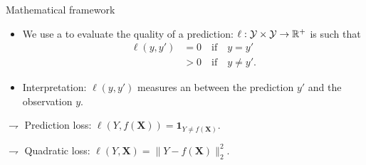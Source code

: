 \documentclass[xcolor={usenames,dvipsnames},handout]{beamer}
\begin{document}
%


\begin{frame}{Mathematical framework}

\begin{itemize}
\item We  use a  to evaluate the quality of a prediction: $\ell : {\mathcal{Y}} \times {\mathcal{Y}} \to \mathbb{R}^+$ is such that
\begin{align*}
\ell(y,y') &= 0 \quad \text{if} \quad y=y' \\
& >0 \quad \text{if} \quad y\neq y'.
\end{align*}
\item Interpretation: $\ell(y,y')$ measures an  between  the prediction $y'$ and the observation $y$.
\end{itemize}

\vspace{.3cm}


\vspace{.2cm}

$\rightharpoondown$ \alert{Prediction} loss: $\ell(Y,f(\textbf{X}))=\mathbf{1}_{Y\neq f(\textbf{X})}$.

$\rightharpoondown$  \alert{Quadratic} loss: $\ell(Y,\textbf{X})=\|Y-f(\textbf{X})\|_2^2$.
\end{frame}
\end{document}
